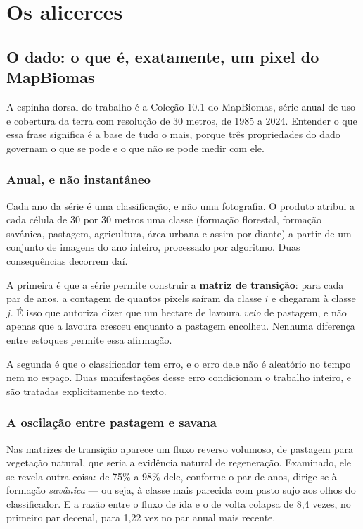 \part{Os alicerces}

\chapter{O dado: o que é, exatamente, um pixel do MapBiomas}

A espinha dorsal do trabalho é a Coleção 10.1 do MapBiomas, série anual de uso
e cobertura da terra com resolução de 30 metros, de 1985 a 2024. Entender o que
essa frase significa é a base de tudo o mais, porque três propriedades do dado
governam o que se pode e o que não se pode medir com ele.

\section{Anual, e não instantâneo}

Cada ano da série é uma classificação, e não uma fotografia. O produto atribui
a cada célula de 30 por 30 metros uma classe (formação florestal, formação
savânica, pastagem, agricultura, área urbana e assim por diante) a partir de um
conjunto de imagens do ano inteiro, processado por algoritmo. Duas
consequências decorrem daí.

A primeira é que a série permite construir a \textbf{matriz de transição}: para
cada par de anos, a contagem de quantos pixels saíram da classe $i$ e chegaram
à classe $j$. É isso que autoriza dizer que um hectare de lavoura \emph{veio}
de pastagem, e não apenas que a lavoura cresceu enquanto a pastagem encolheu.
Nenhuma diferença entre estoques permite essa afirmação.

A segunda é que o classificador tem erro, e o erro dele não é aleatório no
tempo nem no espaço. Duas manifestações desse erro condicionam o trabalho
inteiro, e são tratadas explicitamente no texto.

\section{A oscilação entre pastagem e savana}

Nas matrizes de transição aparece um fluxo reverso volumoso, de pastagem para
vegetação natural, que seria a evidência natural de regeneração. Examinado, ele
se revela outra coisa: de 75\% a 98\% dele, conforme o par de anos, dirige-se à
formação \emph{savânica} --- ou seja, à classe mais parecida com pasto sujo aos
olhos do classificador. E a razão entre o fluxo de ida e o de volta colapsa de
8,4 vezes, no primeiro par decenal, para 1,22 vez no par anual mais recente.

